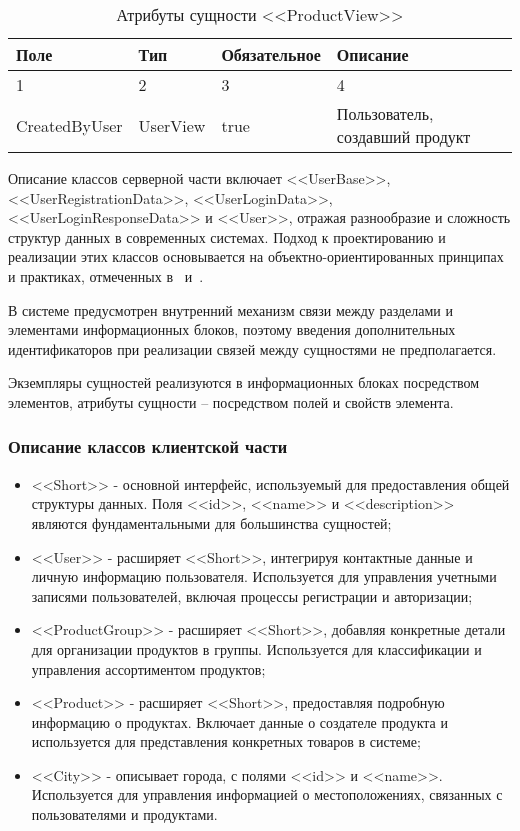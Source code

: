 \vspace{\baselineskip}

\begin{xltabular}{\textwidth}{|l|l|p{1.7cm}|X|}
    \caption{Атрибуты сущности <<ProductView>>}\\ \hline
    Поле & Тип & Обяза\-тельное & Описание \\  & 2 & 3 & 4 \\ \hline
    CreatedByUser & UserView & true & Пользователь, создавший продукт \\ \hline
\end{xltabular}

Описание классов серверной части включает <<UserBase>>, <<UserRegistrationData>>, <<UserLoginData>>, <<UserLoginResponseData>> и <<User>>, отражая разнообразие и сложность структур данных в современных системах. Подход к проектированию и реализации этих классов основывается на объектно-ориентированных принципах и практиках, отмеченных в~\cite{grinchenko} и~\cite{kumskova}.

В системе предусмотрен внутренний механизм связи между разделами и элементами информационных блоков, поэтому введения дополнительных идентификаторов при реализации связей между сущностями не предполагается.

Экземпляры сущностей реализуются в информационных блоках посредством элементов, атрибуты сущности – посредством полей и свойств элемента.

\subsubsection{Описание классов клиентской части}

\begin{itemize}
    \item <<Short>> -\- основной интерфейс, используемый для предоставления общей структуры данных. Поля <<id>>, <<name>> и <<description>> являются фундаментальными для большинства сущностей;
    \item <<User>> -\- расширяет <<Short>>, интегрируя контактные данные и личную информацию пользователя. Используется для управления учетными записями пользователей, включая процессы регистрации и авторизации;
    \item <<ProductGroup>> -\- расширяет <<Short>>, добавляя конкретные детали для организации продуктов в группы. Используется для классификации и управления ассортиментом продуктов;
    \item <<Product>> -\- расширяет <<Short>>, предоставляя подробную информацию о продуктах. Включает данные о создателе продукта и используется для представления конкретных товаров в системе;
    \item <<City>> -\- описывает города, с полями <<id>> и <<name>>. Используется для управления информацией о местоположениях, связанных с пользователями и продуктами.
\end{itemize}

